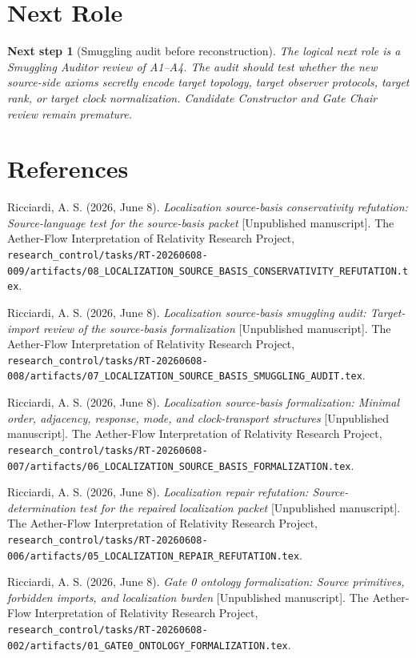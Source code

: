 \documentclass[11pt]{article}
\newtheorem{nextstep}{Next step}
\begin{document}
\section{Next Role}

\begin{nextstep}[Smuggling audit before reconstruction]
The logical next role is a Smuggling Auditor review of A1--A4. The audit
should test whether the new source-side axioms secretly encode target
topology, target observer protocols, target rank, or target clock
normalization. Candidate Constructor and Gate Chair review remain premature.
\end{nextstep}

\section*{References}

Ricciardi, A. S. (2026, June 8). \emph{Localization source-basis
conservativity refutation: Source-language test for the source-basis packet}
[Unpublished manuscript]. The Aether-Flow Interpretation of Relativity
Research Project,
\texttt{research\_control/tasks/RT-20260608-009/artifacts/08\_LOCALIZATION\_SOURCE\_BASIS\_CONSERVATIVITY\_REFUTATION.tex}.

Ricciardi, A. S. (2026, June 8). \emph{Localization source-basis smuggling
audit: Target-import review of the source-basis formalization} [Unpublished
manuscript]. The Aether-Flow Interpretation of Relativity Research Project,
\texttt{research\_control/tasks/RT-20260608-008/artifacts/07\_LOCALIZATION\_SOURCE\_BASIS\_SMUGGLING\_AUDIT.tex}.

Ricciardi, A. S. (2026, June 8). \emph{Localization source-basis
formalization: Minimal order, adjacency, response, mode, and clock-transport
structures} [Unpublished manuscript]. The Aether-Flow Interpretation of
Relativity Research Project,
\texttt{research\_control/tasks/RT-20260608-007/artifacts/06\_LOCALIZATION\_SOURCE\_BASIS\_FORMALIZATION.tex}.

Ricciardi, A. S. (2026, June 8). \emph{Localization repair refutation:
Source-determination test for the repaired localization packet} [Unpublished
manuscript]. The Aether-Flow Interpretation of Relativity Research Project,
\texttt{research\_control/tasks/RT-20260608-006/artifacts/05\_LOCALIZATION\_REPAIR\_REFUTATION.tex}.

Ricciardi, A. S. (2026, June 8). \emph{Gate 0 ontology formalization: Source
primitives, forbidden imports, and localization burden} [Unpublished
manuscript]. The Aether-Flow Interpretation of Relativity Research Project,
\texttt{research\_control/tasks/RT-20260608-002/artifacts/01\_GATE0\_ONTOLOGY\_FORMALIZATION.tex}.
\end{document}
